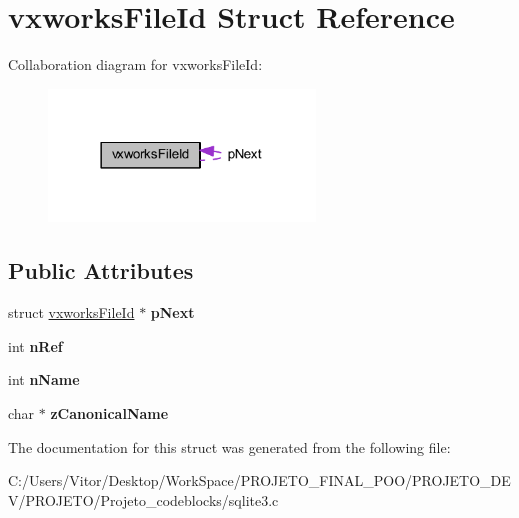 \hypertarget{structvxworks_file_id}{\section{vxworks\-File\-Id Struct Reference}
\label{structvxworks_file_id}
}


Collaboration diagram for vxworks\-File\-Id\-:\nopagebreak
\begin{figure}[H]
\begin{center}
\leavevmode
\includegraphics[width=201pt]{structvxworks_file_id__coll__graph}
\end{center}
\end{figure}
\subsection*{Public Attributes}
\begin{DoxyCompactItemize}
\item 
\hypertarget{structvxworks_file_id_a1941104384e7aa1ad9d8574d091abe3a}{struct \hyperlink{structvxworks_file_id}{vxworks\-File\-Id} $\ast$ {\bfseries p\-Next}}\label{structvxworks_file_id_a1941104384e7aa1ad9d8574d091abe3a}

\item 
\hypertarget{structvxworks_file_id_a59dde49ee027786a06de8ad59b1d7883}{int {\bfseries n\-Ref}}\label{structvxworks_file_id_a59dde49ee027786a06de8ad59b1d7883}

\item 
\hypertarget{structvxworks_file_id_af7ed9a749d73b74b534bc06baf1abf6d}{int {\bfseries n\-Name}}\label{structvxworks_file_id_af7ed9a749d73b74b534bc06baf1abf6d}

\item 
\hypertarget{structvxworks_file_id_a032c9aaaa13ff100d9f3cd53926587fe}{char $\ast$ {\bfseries z\-Canonical\-Name}}\label{structvxworks_file_id_a032c9aaaa13ff100d9f3cd53926587fe}

\end{DoxyCompactItemize}


The documentation for this struct was generated from the following file\-:\begin{DoxyCompactItemize}
\item 
C\-:/\-Users/\-Vitor/\-Desktop/\-Work\-Space/\-P\-R\-O\-J\-E\-T\-O\-\_\-\-F\-I\-N\-A\-L\-\_\-\-P\-O\-O/\-P\-R\-O\-J\-E\-T\-O\-\_\-\-D\-E\-V/\-P\-R\-O\-J\-E\-T\-O/\-Projeto\-\_\-codeblocks/sqlite3.\-c\end{DoxyCompactItemize}
